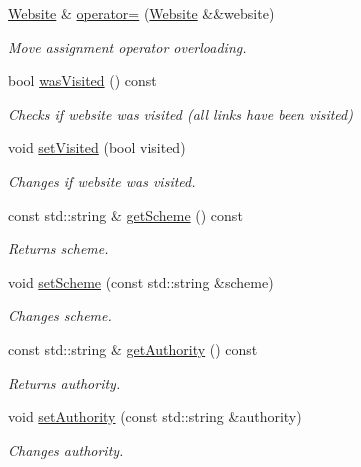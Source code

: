 \begin{DoxyCompactItemize}
\hyperlink{class_crawler_1_1_website}{Website} \& \hyperlink{class_crawler_1_1_website_a2a2e817a709a813f3be842450012c672}{operator=} (\hyperlink{class_crawler_1_1_website}{Website} \&\&website)
\begin{DoxyCompactList}\small\item\em Move assignment operator overloading. \end{DoxyCompactList}\item 
bool \hyperlink{class_crawler_1_1_website_a79d21d817e6cfa9300d448540df03400}{was\+Visited} () const 
\begin{DoxyCompactList}\small\item\em Checks if website was visited (all links have been visited) \end{DoxyCompactList}\item 
void \hyperlink{class_crawler_1_1_website_ac9e3218e95e4121b730958d6f4d5ab88}{set\+Visited} (bool visited)
\begin{DoxyCompactList}\small\item\em Changes if website was visited. \end{DoxyCompactList}\item 
const std\+::string \& \hyperlink{class_crawler_1_1_website_a332143681603ea9dc70dfbfe5b8c1b95}{get\+Scheme} () const 
\begin{DoxyCompactList}\small\item\em Returns scheme. \end{DoxyCompactList}\item 
void \hyperlink{class_crawler_1_1_website_a423aecbab2d73031b42ac9f986c4aa58}{set\+Scheme} (const std\+::string \&scheme)
\begin{DoxyCompactList}\small\item\em Changes scheme. \end{DoxyCompactList}\item 
const std\+::string \& \hyperlink{class_crawler_1_1_website_a108463b7bc848fb9b86b7b7601f94f68}{get\+Authority} () const 
\begin{DoxyCompactList}\small\item\em Returns authority. \end{DoxyCompactList}\item 
void \hyperlink{class_crawler_1_1_website_aae4b1c88160dde492aa935494177764f}{set\+Authority} (const std\+::string \&authority)
\begin{DoxyCompactList}\small\item\em Changes authority. \end{DoxyCompactList}\item 

\end{DoxyCompactItemize}
